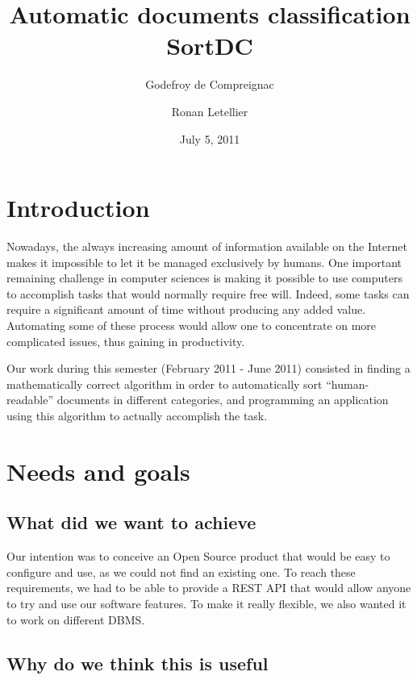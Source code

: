 \documentclass[a4paper,11pt]{article}
\title{Automatic documents classification\\
SortDC}
\author{Godefroy de Compreignac \and Ronan Letellier}
\date{July 5, 2011}
\begin{document}

\maketitle

\setcounter{page}{0}
\thispagestyle{empty}



\clearpage
\tableofcontents{}



\clearpage
\section*{Introduction}

Nowadays, the always increasing amount of information available on the Internet makes it impossible to let it be managed exclusively by humans. One important remaining challenge in computer sciences is making it possible to use computers to accomplish tasks that would normally require free will. Indeed, some tasks can require a significant amount of time without producing any added value. Automating some of these process would allow one to concentrate on more complicated issues, thus gaining in productivity.

Our work during this semester (February 2011 - June 2011) consisted in finding a mathematically correct algorithm in order to automatically sort “human-readable” documents
in different categories, and programming an application using this algorithm to actually accomplish the task.



\section{Needs and goals}


\subsection{What did we want to achieve}

Our intention was to conceive an Open Source product that would be easy to configure and use, as we could not find an existing one. To reach these requirements, we had to be able to provide a REST API that would allow anyone to try and use our software features. To make it really flexible, we also wanted it to work on different DBMS.


\subsection{Why do we think this is useful}
\end{document}
